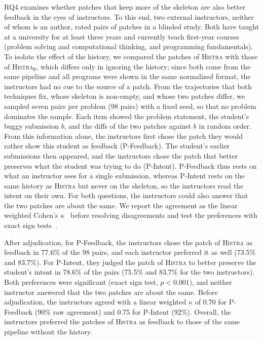 \documentclass[10pt,conference]{IEEEtran}
\begin{document}
RQ4 examines whether patches that keep more of the skeleton are also better feedback in the eyes of instructors. To this end, two external instructors, neither of whom is an author, rated pairs of patches in a blinded study. Both have taught at a university for at least three years and currently teach first-year courses (problem solving and computational thinking, and programming fundamentals). To isolate the effect of the history, we compared the patches of \textsc{Histra} with those of \textsc{Histra}$_{\emptyset}$, which differs only in ignoring the history; since both come from the same pipeline and all programs were shown in the same normalized format, the instructors had no cue to the source of a patch. From the trajectories that both techniques fix, whose skeleton is non-empty, and whose two patches differ, we sampled seven pairs per problem (98 pairs) with a fixed seed, so that no problem dominates the sample. Each item showed the problem statement, the student's buggy submission $b$, and the diffs of the two patches against $b$ in random order. From this information alone, the instructors first chose the patch they would rather show this student as feedback (P-Feedback). The student's earlier submissions then appeared, and the instructors chose the patch that better preserves what the student was trying to do (P-Intent). P-Feedback thus rests on what an instructor sees for a single submission, whereas P-Intent rests on the same history as \textsc{Histra} but never on the skeleton, so the instructors read the intent on their own. For both questions, the instructors could also answer that the two patches are about the same. We report the agreement as the linear weighted Cohen's $\kappa$~\cite{cohen1968weighted} before resolving disagreements and test the preferences with exact sign tests~\cite{dixon1946statistical}.

After adjudication, for P-Feedback, the instructors chose the patch of \textsc{Histra} as feedback in 77.6\% of the 98 pairs, and each instructor preferred it as well (73.5\% and 83.7\%). For P-Intent, they judged the patch of \textsc{Histra} to better preserve the student's intent in 78.6\% of the pairs (75.5\% and 83.7\% for the two instructors). Both preferences were significant (exact sign test, $p < 0.001$), and neither instructor answered that the two patches are about the same. Before adjudication, the instructors agreed with a linear weighted $\kappa$ of 0.70 for P-Feedback (90\% raw agreement) and 0.75 for P-Intent (92\%). Overall, the instructors preferred the patches of \textsc{Histra} as feedback to those of the same pipeline without the history.
\end{document}
